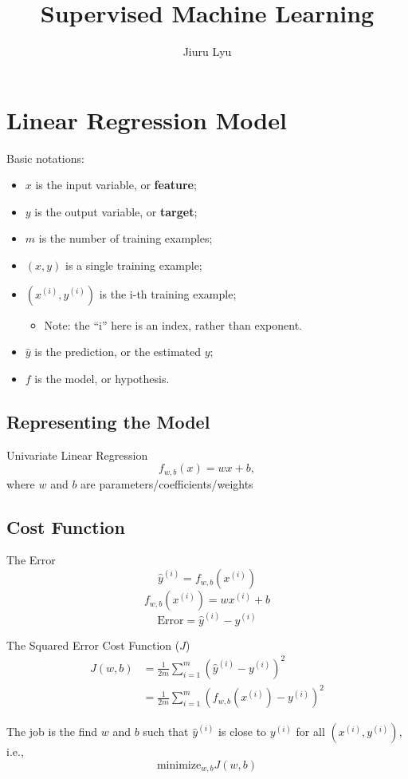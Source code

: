 \documentclass[12pt,a4paper]{article}
\title{Supervised Machine Learning}
\author{Jiuru Lyu}
\date{ }
\begin{document}
\maketitle
\tableofcontents
\newpage

\section{Linear Regression Model}
Basic notations: 
\begin{itemize}
	\item $x$ is the input variable, or \textbf{feature};
	\item $y$ is the output variable, or \textbf{target};
	\item $m$ is the number of training examples;
	\item $(x,y)$ is a single training example;
	\item $(x^{(i)},y^{(i)})$ is the i-th training example;
	\begin{itemize}
  		\item Note: the “i” here is an index, rather than exponent.
	\end{itemize}
	\item $\hat{y}$ is the prediction, or the estimated $y$;
	\item $f$ is the model, or hypothesis.
	\end{itemize}
	
\subsection{Representing the Model}
\begin{thmbox}{Univariate Linear Regression}
	$$f_{w,b}(x)=wx+b,$$ where $w$ and $b$ are parameters/coefficients/weights
\end{thmbox}

\subsection{Cost Function}
\begin{thmbox}{The Error}
$$\hat{y}^{(i)}=f_{w,b}\left(x^{(i)}\right)$$
$$f_{w,b}\left(x^{(i)}\right)=wx^{(i)}+b$$
$$\text{Error}=\hat{y}^{(i)}-y^{(i)}$$
\end{thmbox}
\begin{thmbox}{The Squared Error Cost Function ($J$)}
	$$\begin{aligned}
		J(w,b)&=\frac{1}{2m}\sum_{i=1}^m\left(\hat{y}^{(i)}-y^{(i)}\right)^2\\
		&=\frac{1}{2m}\sum_{i=1}^m\left(f_{w,b}\left(x^{(i)}\right)-y^{(i)}\right)^2
	\end{aligned}$$
\end{thmbox}
The job is the find $w$ and $b$ such that $\hat{y}^{(i)}$ is close to $y^{(i)}$ for all $(x^{(i)},y^{(i)})$, i.e., $$\text{minimize}_{w,b}J(w,b)$$
\end{document}
